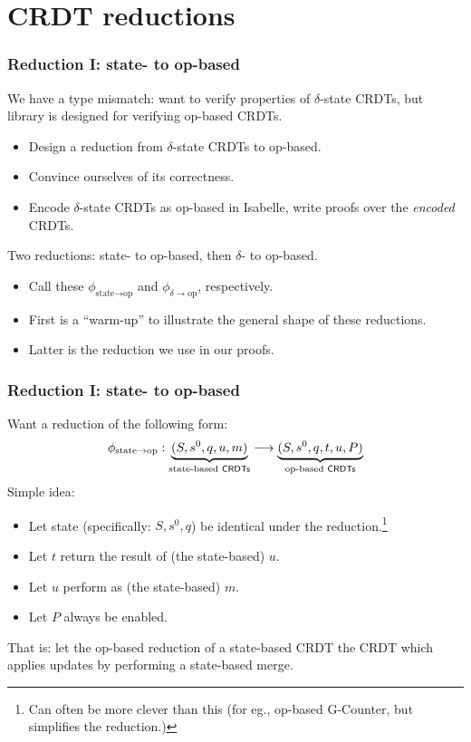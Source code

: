 \documentclass[aspectratio=169,compress,handout]{beamer}
\newcommand*{\CRDT}{\textsf{CRDT}\xspace}
\newcommand*{\CRDTs}{\textsf{CRDTs}\xspace}
\begin{document}
  \section{\CRDT reductions}
  \begin{frame}
    \frametitle{Reduction I: state- to op-based}

    We have a type mismatch: want to verify properties of $\delta$-state \CRDTs,
    but library is designed for verifying op-based \CRDTs.
    \begin{itemize}[<+(1)->]
      \item Design a reduction from $\delta$-state \CRDTs to op-based.
      \item Convince ourselves of its correctness.
      \item Encode $\delta$-state \CRDTs as op-based in Isabelle, write proofs
        over the \emph{encoded} \CRDTs.
    \end{itemize}
    \pause
    Two reductions: state- to op-based, then $\delta$- to op-based.
    \begin{itemize}[<+(1)->]
      \item Call these $\phi_{\text{state} \to \text{op}}$ and $\phi_{\delta
        \to \text{op}}$, respectively.
      \item First is a ``warm-up'' to illustrate the general shape of these
        reductions.
      \item Latter is the reduction we use in our proofs.
    \end{itemize}
  \end{frame}

  \begin{frame}
    \frametitle{Reduction I: state- to op-based}
    Want a reduction of the following form:
    \[
      \phi_{\text{state} \to \text{op}} :
        \underbrace{(S, s^0, q, u, m)}_{\text{state-based \CRDTs}} \longrightarrow
        \underbrace{(S, s^0, q, t, u, P)}_{\text{op-based \CRDTs}}
    \]
    \pause
    Simple idea:
    \begin{itemize}[<+->]
      \item Let state (specifically: $S, s^0, q$) be identical under the
        reduction.\footnote{Can often be more clever than this (for eg.,
        op-based G-Counter, but simplifies the reduction.)}
      \item Let $t$ return the result of (the state-based) $u$.
      \item Let $u$ perform as (the state-based) $m$.
      \item Let $P$ always be enabled.
    \end{itemize}
    \pause
    That is: let the op-based reduction of a state-based \CRDT the \CRDT which
    applies updates by performing a state-based merge.
  \end{frame}
\end{document}

